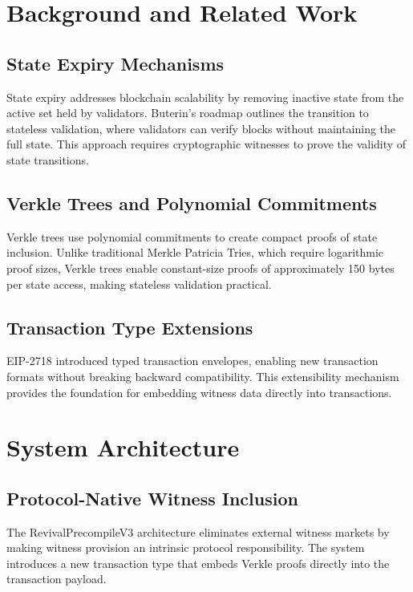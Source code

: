 \documentclass{article}
\begin{document}
\section{Background and Related Work}

\subsection{State Expiry Mechanisms}

State expiry addresses blockchain scalability by removing inactive state from the active set held by validators. Buterin's roadmap \cite{buterin2021statelessness} outlines the transition to stateless validation, where validators can verify blocks without maintaining the full state. This approach requires cryptographic witnesses to prove the validity of state transitions.

\subsection{Verkle Trees and Polynomial Commitments}

Verkle trees \cite{kuszmaul2019verkle} use polynomial commitments \cite{kate2010polynomial} to create compact proofs of state inclusion. Unlike traditional Merkle Patricia Tries, which require logarithmic proof sizes, Verkle trees enable constant-size proofs of approximately 150 bytes per state access, making stateless validation practical.

\subsection{Transaction Type Extensions}

EIP-2718 \cite{zoltu2020eip2718} introduced typed transaction envelopes, enabling new transaction formats without breaking backward compatibility. This extensibility mechanism provides the foundation for embedding witness data directly into transactions.

\section{System Architecture}

\subsection{Protocol-Native Witness Inclusion}

The RevivalPrecompileV3 architecture eliminates external witness markets by making witness provision an intrinsic protocol responsibility. The system introduces a new transaction type that embeds Verkle proofs directly into the transaction payload.
\end{document}
